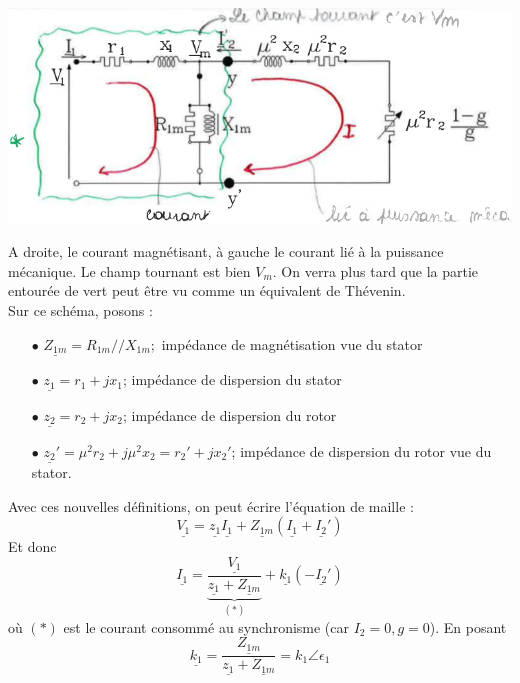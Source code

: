 			\begin{center}
		\includegraphics[scale=0.45]{ch5/image27.png}
		\end{center}
		\newpage
		A droite, le courant magnétisant, à gauche le courant lié à la 
		puissance mécanique. Le champ tournant est bien $V_m$. On verra plus tard que la partie 
		entourée de vert peut être vu comme  un équivalent de Thévenin.\\
		Sur ce schéma, posons :
		\begin{itemize}
		\item[$\bullet$] $\underline{Z_{1m}} = R_{1m} // X_{1m} ;$ impédance de magnétisation 
		vue du stator
		\item[$\bullet$] $\underline{z_1} = r_1+jx_1$; impédance de dispersion du stator
		\item[$\bullet$] $\underline{z_2} = r_2+jx_2$; impédance de dispersion du rotor
		\item[$\bullet$] $\underline{z_2}' = \mu^2r_2+j\mu^2x_2 = r_2'+jx_2'$; impédance de 
		dispersion du rotor vue du 	stator.
		\end{itemize}
		Avec ces nouvelles définitions, on peut écrire l'équation de maille :
		\begin{equation}
		\underline{V_1} = \underline{z_1}\underline{I_1} + \underline{Z_{1m}}(\underline{I_1}+
		\underline{I_2}')
		\end{equation}
		Et donc
		\begin{equation}
		\underline{I_1} = \underbrace{\dfrac{\underline{V_1}}{\underline{z_1}+\underline{Z_{1m
		}}}}_{(*)}
		+ \underline{k_1}(-\underline{I_2}')
		\end{equation}
		où $(*)$ est le courant consommé au synchronisme (car $I_2=0, g=0$). En posant 
		\begin{equation}
		\underline{k_1} = \dfrac{\underline{Z_{1m}}}{\underline{z_1}+\underline{Z_{1m}}} = 
		k_1\angle\epsilon_1
		\end{equation}
		
